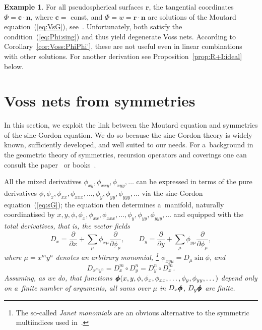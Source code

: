 \documentclass[pdftex]{sigma}
\let\ve\mathbf
\def\eqref#1{{\rm(\ref{#1})}}
\def\pd#1#2{\frac{\partial#1}{\partial#2}}
\def\pmb#1{\hbox{\kern0.3pt#1\llap{#1\kern0.3pt}%
\kern0.3pt\llap{#1\kern0.3pt}\kern0.3pt\llap{#1\kern0.3pt}}}
\def\boldphi{\pmb{$\phi$}}
\numberwithin{equation}{section}
\theoremstyle{definition}
\newtheorem{Example}[Theorem]{Example}
\begin{document}
\begin{Example}
\label{ex:nc}
For all pseudospherical surfaces $\ve r$,
the tangential coordinates $\Phi = \ve c \cdot \ve n$,
where $\ve c =$ const, and
$\Phi = w = \ve r \cdot \ve n$ are solutions of the Moutard
equation~\eqref{eq:VsG},
see~\cite[p.\ 234]{CG-1890b}.
Unfortunately, both satisfy the condition~\eqref{eq:Phi:sing}
and thus yield degenerate Voss nets.
According to Corollary~\ref{cor:Voss:PhiPhi'}, these are not
useful even in linear combinations with other solutions.
For another derivation see Proposition~\ref{prop:R+I:ideal} below.
\end{Example}





\section{Voss nets from symmetries}

\label{sect:sG2Voss}


In this section, we exploit the link between the Moutard equation and
symmetries of the sine-Gordon equation.
We do so because the sine-Gordon theory is
widely known, sufficiently developed, and well suited to our needs.
For a~background in the geometric theory of
symmetries, recursion operators and coverings one can consult
the paper~\cite{ISK-AMV-1989} or books~\cite{B-V-V,JK-AV-RV-2017}.

All the mixed derivatives
$\phi_{xy},\phi_{xxy},\phi_{xyy},\dots$
can be expressed in terms of the pure derivatives
$\phi,\phi_x,\phi_{xx},\phi_{xxx},\dots,\phi_y,\phi_{yy},\phi_{yyy},\dots$
via the sine-Gordon equation~\eqref{eq:sG};
the equation then determines a~manifold,
naturally coordinatised by
$x,y,\phi,\phi_x,\phi_{xx},\phi_{xxx},\dots,
 \phi_y,\phi_{yy},\phi_{yyy},\dots$ and
equipped with the {\it total derivatives,
that is, the vector fields
\[
D_x = \pd{}{x} + \sum_\mu \phi_{x\mu} \pd{}{\phi_\mu},
\qquad
D_y = \pd{}{y} + \sum_\mu \phi_{y\mu} \pd{}{\phi_\mu},
\]
where $\mu = x^m y^n$ denotes an arbitrary monomial,%
\footnote{The so-called {\it Janet monomials} are an obvious alternative
to the symmetric multiindices used in~\cite{B-V-V,JK-AV-RV-2017}.}
$\phi_{xy\mu} = D_\mu \sin\phi$, and
\[
D_{x^m y^n} = D_x^m \circ D_y^n = D_y^n \circ D_x^m.
\]
Assuming, as we do, that functions
$\boldphi(x,y,\phi,\phi_x,\phi_{xx},\dots,\phi_y,\phi_{yy},\dots)$
depend only on a~finite number of arguments,
all sums over $\mu$ in $D_x \boldphi$, $D_y \boldphi$ are finite.}
\end{document}
